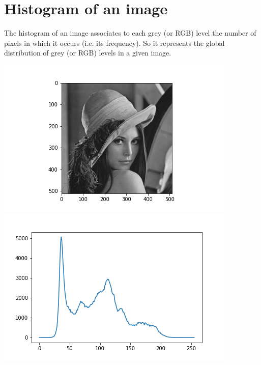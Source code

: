 \section{Histogram of an image}
The histogram of an image associates to each grey (or RGB) level the number of pixels in which it occurs (i.e. its frequency). So it represents the global distribution of grey (or RGB) levels in a given image.
\begin{flushleft}
    \includegraphics[scale=0.5]{images/lena GS.png}
    \includegraphics[scale=0.5]{images/histogram GS.png}
    

\end{flushleft}
